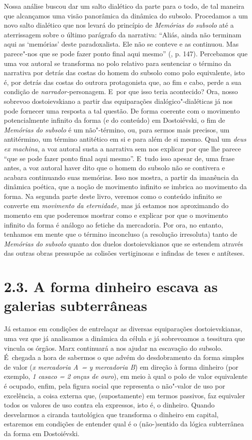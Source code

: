{Nossa análise buscou dar um salto dialético da parte para o todo, de tal
maneira que alcançamos uma visão panorâmica da dinâmica do subsolo.
Procedamos a um novo salto dialético que nos levará do princípio de
\emph{Memórias do subsolo} até a aterrissagem sobre o último parágrafo
da narrativa: ``Aliás, ainda não terminam aqui as `memórias' deste
paradoxalista. Ele não se conteve e as continuou. Mas parece"-nos que se
pode fazer ponto final aqui mesmo'' (, p. 147). Percebamos que uma
voz autoral se transforma no polo relativo para sentenciar o término da
narrativa por detrás das costas do homem do subsolo como polo
equivalente, isto é, por detrás das costas do outrora protagonista que,
ao fim e cabo, perde a sua condição de \emph{narrador-}personagem. E~por
que isso teria acontecido? Ora, nosso sobrevoo dostoievskiano a partir
das equiparações dialógico"-dialéticas já nos pode fornecer uma resposta
a tal questão. De forma coerente com o movimento potencialmente infinito
da forma (e do conteúdo) em Dostoiévski, o fim de \emph{Memórias do
subsolo} é um não"-término, ou, para sermos mais precisos, um
antitérmino, um término antitético em si e para além de si mesmo. Qual
um \emph{deus ex machina}, a voz autoral susta a narrativa sem nos
explicar por que lhe parece ``que se pode fazer ponto final aqui
mesmo''. E~tudo isso apesar de, uma frase antes, a voz autoral haver
dito que o homem do subsolo não se contivera e acabara continuando suas
memórias. Isso nos mostra, a partir da imanência da dinâmica poética,
que a noção de movimento infinito se imbrica ao movimento da forma. Na
segunda parte deste livro, veremos como o conteúdo infinito se converte
em \emph{movimento da eternidade,} mas já estamos nos aproximando do
momento em que poderemos mostrar como e explicar por que o movimento
infinito da forma é análogo ao fetiche da mercadoria. Por ora, no
entanto, tenhamos em mente que o término inconcluso (a resolução
irresoluta) tanto de \emph{Memórias do subsolo} quanto dos duelos
dostoievskianos que se estendem através das outras obras pressupõe as
colisões vertiginosas e infindas de teses e antíteses.

\section{2.3. A forma dinheiro escava as galerias subterrâneas}

Já estamos em condições de entrelaçar as diversas equiparações
dostoievskianas, uma vez que já analisamos a dinâmica da célula e já
sobrevoamos a tessitura que vincula os órgãos. Marx continuará a nos
ajudar na escavação do subsolo. É~chegada a hora de sabermos o que advém
do desdobramento da forma simples de valor (\emph{x mercadoria A~= y
mercadoria B}) em direção à forma dinheiro (por exemplo, \emph{1 casaco
= 2 onças de ouro}), em meio à qual o polo de valor equivalente é
ocupado, enfim, pela figura social que representa o não"-valor de uso por
excelência, a coisa externa que, (supostamente) em termos passivos, faz
equivaler todos os valores de uso contra ela expressos, isto é, o
dinheiro. Quando desvelarmos a ciranda tautológica que transforma o
dinheiro em capital, estaremos em condições de entender qual é o
(não-)sentido da lógica subterrânea da forma em Dostoiévski.

}
